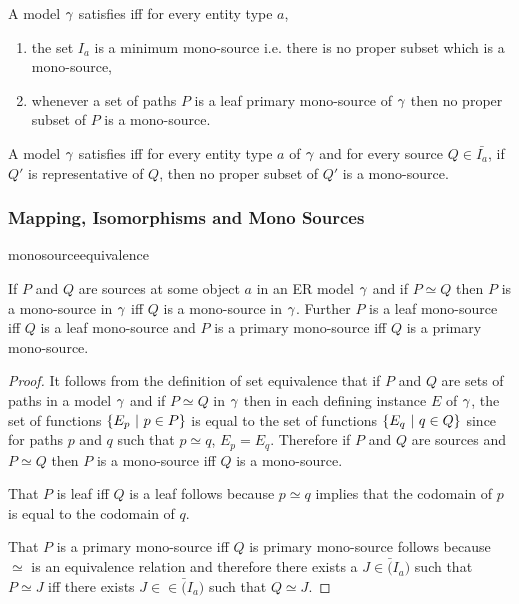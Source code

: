 \begin{definition}
A model $\gamma$ satisfies  iff for every entity type $a$,
\begin{enumerate}
\item the set $I_a$ is a minimum mono-source i.e. there is no proper subset which is a mono-source,
\item whenever a set of paths $P$ is a leaf primary mono-source of $\gamma$ then no proper subset of $P$ is a mono-source.
\end{enumerate}
\end{definition}

\begin{conjecture}
A model $\gamma$ satisfies  iff 
for every entity type $a$ of $\gamma$ and for every source $Q \in \bar{I_a}$, if $Q'$ is representative
of  $Q$, then no proper subset of $Q'$ is a mono-source. 
\end{conjecture}



\subsubsection{Mapping, Isomorphisms and Mono Sources}

monosourceequivalence
\begin{lemma}
\label{monosourceequivalence}
If  $P$ and $Q$ are sources at some object $a$ in an ER model $\gamma$ and if $P \simeq Q$  then   $P$ is a mono-source in $\gamma$ iff $Q$ is a mono-source in $\gamma$.  Further $P$ is a leaf mono-source iff $Q$ is a leaf mono-source and $P$ is a primary mono-source iff $Q$ is a primary mono-source.
\end{lemma}
\begin{proof}
It follows from the definition of set equivalence that if $P$ and $Q$ are sets of paths in a model $\gamma$ and if $P \simeq Q$ in $\gamma$ then in each defining instance $E$ of $\gamma$, the set of functions $\left\{E_p \ \middle|\ p \in P\right\}$ is equal to the set of functions $\left\{E_q \ \middle|\ q \in Q\right\}$ since for
paths $p$ and $q$ such that $p \simeq q$, $E_p=E_q$. Therefore if $P$ and $Q$ are sources and $P \simeq Q$ then $P$ is a mono-source iff $Q$ is a mono-source.


That $P$ is leaf  iff $Q$ is a leaf 
follows because $p \simeq q$ implies that the codomain of $p$ is equal to the codomain of $q$.

That $P$ is a primary mono-source iff $Q$ is  primary mono-source follows because  $\simeq$ is an equivalence relation and therefore there exists a $J \in \bar(I_a)$ such that $P \simeq J$ iff there exists 
$J \in \in \bar(I_a)$ such that $Q \simeq J$. 
\end{proof}

